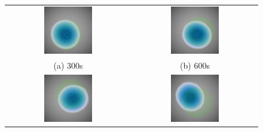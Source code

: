 \begin{figure}[tpb]
	\centering
	\begin{tabular}{cc}
		\includegraphics[width=0.4\textwidth]{numerical-test-figures/parabolic-bowl-1O-depth-300s.png} &
		\includegraphics[width=0.4\textwidth]{numerical-test-figures/parabolic-bowl-1O-depth-600s.png} \\
		(a) 300s &
		(b) 600s \\[6pt]
		\includegraphics[width=0.4\textwidth]{numerical-test-figures/parabolic-bowl-1O-depth-900s.png} &
		\includegraphics[width=0.4\textwidth]{numerical-test-figures/parabolic-bowl-1O-depth-1800s.png} \\

\end{tabular}
\end{figure}
